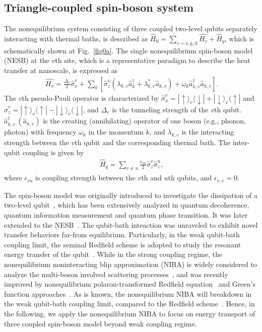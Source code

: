 \documentclass[twocolumn,preprintnumbers,amsmath,amssymb]{revtex4}
\begin{document}
\subsection{Triangle-coupled spin-boson system}
The nonequilibrium system consisting of three coupled two-level qubits separately interacting with thermal baths, is  described as
$\hat{H}_0=\sum_{v=\textrm{s},\textrm{g},\textrm{d}}\hat{H_v}+\hat{H}_{q}$, which is schematically shown at Fig.~\ref{fig0a}.
The single nonequilibrium spin-boson model (NESB) at the $v$th site, which is a representative paradigm to describe the heat transfer at nanoscale, is expressed as~\cite{ajleggett1987rmp,uweiss2008book}
\begin{eqnarray}~\label{ham0}
\hat{H_v}=\frac{\Delta_v}{2}\hat{\sigma}^v_x
+\sum_{k}[\hat{\sigma}^{v}_z(\lambda_{k,v}\hat{a}^{\dag}_{k}+\lambda^{*}_{k,v}\hat{a}_{k,v})
+\omega_k\hat{a}^{\dag}_{k,v}\hat{a}_{k,v}].
\end{eqnarray}
The $v$th pseudo-Pauli operator is characterized by $\hat{\sigma}^v_{x}=|\uparrow{\rangle}_v{\langle}\downarrow|+|\downarrow{\rangle}_v{\langle}\uparrow|$
and $\hat{\sigma}^v_{z}=|\uparrow{\rangle}_v{\langle}\uparrow|-|\downarrow{\rangle}_v{\langle}\downarrow|$,
and $\Delta_v$ is the tunneling strength of the $v$th qubit.
$\hat{a}^{\dag}_{k,v}~(\hat{a}_{k,v})$ is the creating (annihilating) operator of one boson (e.g., phonon, photon) with frequency $\omega_k$ in the momentum $k$,
and $\lambda_{k,v}$ is the interacting strength between the $v$th qubit and the corresponding thermal bath.
The inter-qubit coupling is given by
\begin{eqnarray}~\label{ham1}
\hat{H}_{q}=\sum_{v{\neq}u}\frac{\epsilon_{vu}}{2}\hat{\sigma}^v_z\hat{\sigma}^u_z,
\end{eqnarray}
where $\epsilon_{vu}$ is coupling strength between the $v$th and $u$th qubits, and $\epsilon_{v,v}=0$.


The spin-boson model was originally introduced to investigate the dissipation of a two-level qubit~\cite{ajleggett1987rmp},
which has been extensively analyzed in quantum decoherence, quantum information measurement and quantum phase transition.
It was later extended to the NESB~\cite{dvirasegal2005prl,dsegal2008prl,ksaito2013prl}.
The qubit-bath inteaction was unraveled to exhibit novel transfer behaviors far-from equilibrium.
Particularly, in the weak qubit-bath coupling limit, the seminal Redfield scheme is adopted to study the
resonant energy transfer of the qubit~\cite{dvirasegal2005prl,jieren2010prl}.
While in the strong coupling regime, the nonequilibrium noninteracting blip approximation (NIBA) is widely considered to analyze the
multi-boson involved scattering processes~\cite{hdekker1987pra,dvirasegal2006prb,tianchen2013prb},
and was recently improved by nonequilibrium polaron-transformed Redfield equation~\cite{cwang2015sr,dzxu2016fp,cwang2017pra}
and Green's function approaches~\cite{jjliu2016cp,jjliu2017pre}.
As is known, the nonequilibrium NIBA will breakdown in the weak qubit-bath coupling limit, compared to the Redfield scheme~\cite{tianchen2013prb,cwang2015sr}.
Hence, in the following, we apply the nonequilibrium NIBA to focus on energy transport of three coupled spin-boson model beyond weak coupling regime.
\end{document}
